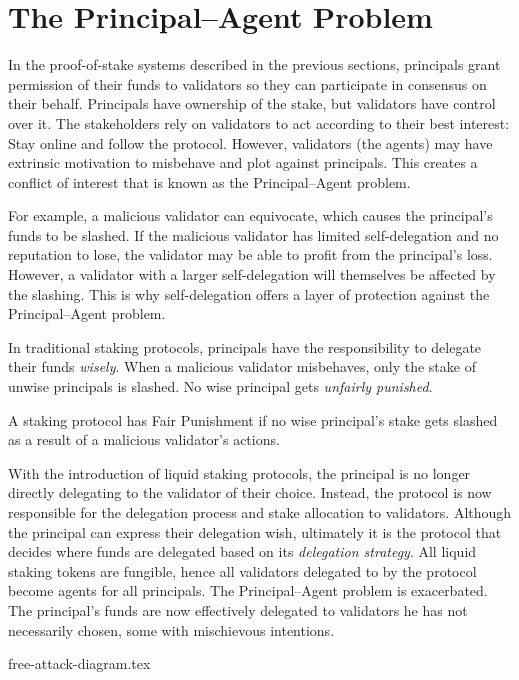 \section{The Principal--Agent Problem}
In the proof-of-stake systems described in the previous sections,
principals grant permission of their funds to validators so they can
participate in consensus on their behalf.
Principals have ownership of the stake, but
validators have control over it.
The stakeholders rely on validators to act according to their
best interest: Stay online and follow the protocol.
However, validators (the agents) may have extrinsic motivation to
misbehave and plot against principals. This creates
a conflict of interest that is known as the Principal--Agent problem.

For example, a malicious validator can equivocate, which causes
the principal's funds to be slashed. If the malicious validator has
limited self-delegation and no reputation to lose, the validator
may be able to profit from the principal's loss. However, a validator
with a larger self-delegation will themselves be affected by the slashing.
This is why self-delegation offers a layer of protection
against the Principal--Agent problem.

In traditional staking protocols, principals have the responsibility to
delegate their funds \emph{wisely}.
When a malicious validator misbehaves, only the stake of unwise principals is
slashed. No wise principal gets \emph{unfairly punished}.

\begin{definition}
    A staking protocol has Fair Punishment if no wise principal's
    stake gets slashed as a result of a malicious validator's actions.
\end{definition}

With the introduction of liquid staking protocols, the principal
is no longer directly delegating to the validator of their choice.
Instead, the protocol is now responsible for the delegation process
and stake allocation to validators.
Although the principal can express their delegation wish, ultimately
it is the protocol that decides where funds are delegated based on its
\emph{delegation strategy}. All liquid staking tokens are fungible,
hence all validators delegated to by
the protocol become agents for all principals.
The Principal--Agent problem is exacerbated.
The principal's funds are now effectively delegated to validators
he has not necessarily chosen, some with mischievous intentions.

\ifccs
  {free-attack-diagram.tex}
\fi

